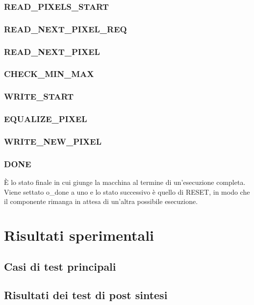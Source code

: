 \documentclass{article}
\begin{document}
\subsubsection{READ\_PIXELS\_START}
\subsubsection{READ\_NEXT\_PIXEL\_REQ}
\subsubsection{READ\_NEXT\_PIXEL}
\subsubsection{CHECK\_MIN\_MAX}
\subsubsection{WRITE\_START}
\subsubsection{EQUALIZE\_PIXEL}
\subsubsection{WRITE\_NEW\_PIXEL}
\subsubsection{DONE}
È lo stato finale in cui giunge la macchina al termine di un'esecuzione completa. Viene settato o\_done a uno e lo stato successivo è quello di RESET, in modo che il componente rimanga in attesa di un'altra possibile esecuzione.

\section{Risultati sperimentali}
\subsection{Casi di test principali}
\subsection{Risultati dei test di post sintesi}
\end{document}
